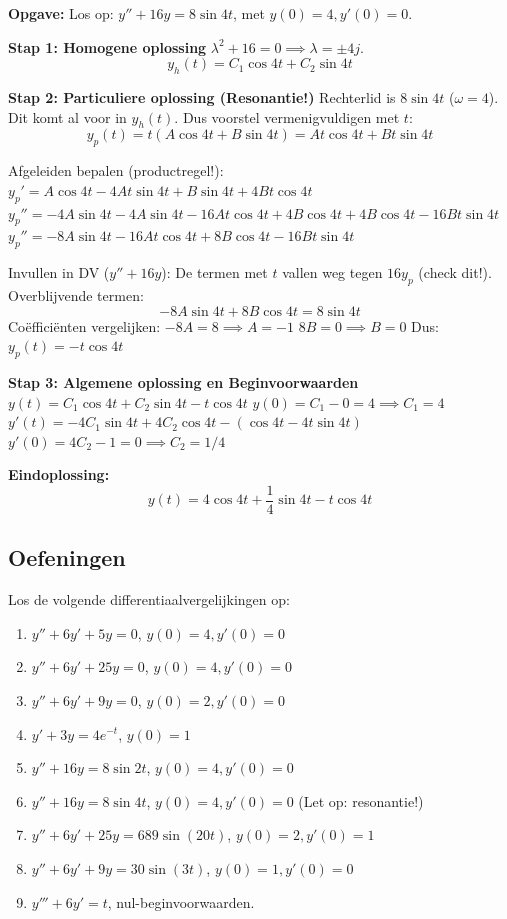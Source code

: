 \begin{oefenblok}
\textbf{Opgave:} Los op: $y'' + 16y = 8\sin 4t$, met $y(0)=4, y'(0)=0$.

\textbf{Stap 1: Homogene oplossing}
$\lambda^2 + 16 = 0 \implies \lambda = \pm 4j$.
\[ y_h(t) = C_1 \cos 4t + C_2 \sin 4t \]

\textbf{Stap 2: Particuliere oplossing (Resonantie!)}
Rechterlid is $8\sin 4t$ ($\omega=4$). Dit komt al voor in $y_h(t)$.
Dus voorstel vermenigvuldigen met $t$:
\[ y_p(t) = t(A \cos 4t + B \sin 4t) = At \cos 4t + Bt \sin 4t \]

Afgeleiden bepalen (productregel!):
$y_p' = A \cos 4t - 4At \sin 4t + B \sin 4t + 4Bt \cos 4t$
$y_p'' = -4A \sin 4t - 4A \sin 4t - 16At \cos 4t + 4B \cos 4t + 4B \cos 4t - 16Bt \sin 4t$
$y_p'' = -8A \sin 4t - 16At \cos 4t + 8B \cos 4t - 16Bt \sin 4t$

Invullen in DV ($y'' + 16y$):
De termen met $t$ vallen weg tegen $16y_p$ (check dit!).
Overblijvende termen:
\[ -8A \sin 4t + 8B \cos 4t = 8 \sin 4t \]
Coëfficiënten vergelijken:
$-8A = 8 \implies A = -1$
$8B = 0 \implies B = 0$
Dus: $y_p(t) = -t \cos 4t$

\textbf{Stap 3: Algemene oplossing en Beginvoorwaarden}
$y(t) = C_1 \cos 4t + C_2 \sin 4t - t \cos 4t$
$y(0) = C_1 - 0 = 4 \implies C_1 = 4$
$y'(t) = -4C_1 \sin 4t + 4C_2 \cos 4t - (\cos 4t - 4t \sin 4t)$
$y'(0) = 4C_2 - 1 = 0 \implies C_2 = 1/4$

\textbf{Eindoplossing:}
\[ \boxed{y(t) = 4 \cos 4t + \frac{1}{4} \sin 4t - t \cos 4t} \]
\end{oefenblok}

\subsection{Oefeningen}
Los de volgende differentiaalvergelijkingen op:
\begin{enumerate}
    \item $y'' + 6y' + 5y = 0$, $y(0)=4, y'(0)=0$
    \item $y'' + 6y' + 25y = 0$, $y(0)=4, y'(0)=0$
    \item $y'' + 6y' + 9y = 0$, $y(0)=2, y'(0)=0$
    \item $y' + 3y = 4e^{-t}$, $y(0)=1$
    \item $y'' + 16y = 8\sin 2t$, $y(0)=4, y'(0)=0$
    \item $y'' + 16y = 8\sin 4t$, $y(0)=4, y'(0)=0$ (Let op: resonantie!)
    \item $y'' + 6y' + 25y = 689\sin(20t)$, $y(0)=2, y'(0)=1$
    \item $y'' + 6y' + 9y = 30\sin(3t)$, $y(0)=1, y'(0)=0$
    \item $y''' + 6y' = t$, nul-beginvoorwaarden.
\end{enumerate}